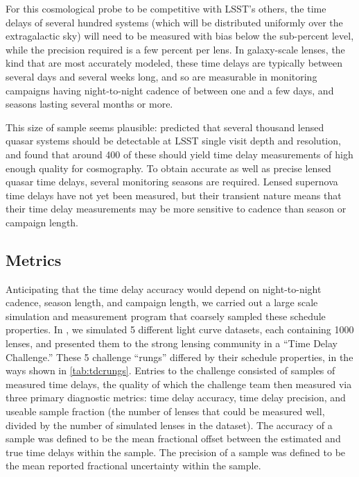 For this cosmological probe to be competitive with LSST's others, the
time delays of several hundred systems (which will be distributed
uniformly over the extragalactic sky) will need to be measured with
bias below the sub-percent level, while the precision required is a
few percent per lens.  In galaxy-scale lenses, the kind that are most
accurately modeled, these time delays are typically between several
days and several weeks long, and so are measurable in monitoring
campaigns having night-to-night cadence of between one and a few days,
and seasons lasting several months or more.

This size of sample seems plausible: \citet{OM10} predicted that several thousand lensed quasar systems should be detectable at LSST single visit depth and resolution, and \citet{LiaoEtal2015} found that around 400 of these should yield time delay measurements of high enough quality for cosmography.
To obtain accurate as well as precise lensed quasar time delays, several
monitoring seasons are required. Lensed supernova time delays have not
yet been measured, but their transient nature means that their time
delay measurements may be more sensitive to cadence than season or
campaign length.


\subsection{Metrics}
\label{sec:\secname:metrics}

Anticipating that the time delay accuracy would depend on night-to-night
cadence, season length, and campaign length, we carried out a large
scale simulation and measurement program that coarsely sampled these
schedule properties. In \citet{LiaoEtal2015}, we simulated 5 different
light curve datasets, each containing 1000 lenses, and presented them to
the strong lensing community in a ``Time Delay Challenge.'' These 5
challenge ``rungs'' differed by their schedule properties, in the ways
shown in \autoref{tab:tdcrungs}. Entries to the challenge consisted of samples of measured time delays, the quality of which the challenge team then measured via three primary diagnostic metrics: time delay accuracy, time delay
precision, and useable sample fraction (\ie the number of lenses that could be measured well, divided by the number of simulated lenses in the dataset). The accuracy of a sample was defined to be the mean fractional offset between the estimated and true time delays within the sample. The precision of a sample was defined to be the mean reported fractional uncertainty within the sample.


